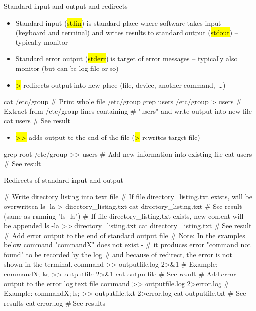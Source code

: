 \documentclass[compress, ucs, xelatex, 11pt, xcolor=svgnames,
  hyperref={
    bookmarks=true,
    unicode=true,
    colorlinks=true,
    pdftitle={Linux, command line and MetaCentrum},
    plainpages=false,
    pdfauthor={Vojtech Zeisek},
    pdfsubject={Course about use of Linux command line, writing shell scripts and using MetaCentrum of CESNET},
    pdfcreator={XeLaTeX},
    pdfkeywords={Linux, GNU, BASH, shell, command line, MetaCentrum},
    linkcolor=DarkRed,
    anchorcolor=DarkBlue,
    citecolor=Indigo,
    filecolor=NavyBlue,
    menucolor=DarkMagenta,
    urlcolor=DarkBlue,
    pdftex},
  url={hyphens, lowtilde} %
  ]{beamer}
\renewcommand{\texttt}[1]{\hl{\ttfamily #1}}
\renewcommand{\alert}[1]{\textcolor{red}{#1}}
\begin{document}
\begin{frame}[fragile]{Standard input and output and redirects}
  \begin{itemize}
    \item Standard input (\texttt{stdin}) is standard place where software takes input (keyboard and terminal) and writes results to standard output (\texttt{stdout}) -- typically monitor
    \item Standard error output (\texttt{stderr}) is target of error messages -- typically also monitor (but can be log file or so)
    \item \alert{\texttt{\textgreater}} redirects output into new place (file, device, another command,~\ldots)
  \end{itemize}
  \begin{bashcode}
    cat /etc/group # Print whole file /etc/group
    grep users /etc/group > users # Extract from /etc/group lines containing
                                  # "users" and write output into new file
    cat users # See result
  \end{bashcode}
  \begin{itemize}
    \item \alert{\texttt{\textgreater\textgreater}} adds output to the end of the file (\texttt{\textgreater} rewrites target file)
  \end{itemize}
  \begin{bashcode}
    grep root /etc/group >> users # Add new information into existing file
    cat users # See result
  \end{bashcode}
\end{frame}

\begin{frame}[fragile]{Redirects of standard input and output}
  \begin{bashcode}
    # Write directory listing into text file
    # If file directory_listing.txt exists, will be overwritten
    ls -la > directory_listing.txt
    cat directory_listing.txt # See result (same as running "ls -la")
    # If file directory_listing.txt exists, new content will be appended
    ls -la >> directory_listing.txt
    cat directory_listing.txt # See result
    # Add error output to the end of standard output file
    # Note: In the examples below command "commandX" does not exist -
    # it produces error "command not found" to be recorded by the log
    # and because of redirect, the error is not shown in the terminal.
    command >> outputfile.log 2>&1 # Example:
    { commandX; ls; } >> outputfile 2>&1
    cat outputfile # See result
    # Add error output to the error log text file
    command >> outputfile.log 2>error.log # Example:
    { commandX; ls; } >> outputfile.txt 2>error.log
    cat outputfile.txt # See results
    cat error.log # See results
  \end{bashcode}
\end{frame}
\end{document}
